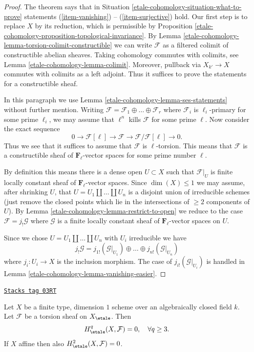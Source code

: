 \begin{proof}
The theorem says that in Situation \ref{etale-cohomology-situation-what-to-prove}
statements (\ref{item-vanishing}) -- (\ref{item-surjective}) hold.
Our first step is to replace $X$ by its reduction, which is permissible
by Proposition \ref{etale-cohomology-proposition-topological-invariance}.
By Lemma \ref{etale-cohomology-lemma-torsion-colimit-constructible} we can write
$\mathcal{F}$ as a filtered colimit of constructible abelian sheaves.
Taking cohomology commutes with colimits, see Lemma \ref{etale-cohomology-lemma-colimit}.
Moreover, pullback via $X_{k'} \to X$ commutes with colimits as a left
adjoint. Thus it suffices to prove the statements for a constructible sheaf.

\medskip\noindent
In this paragraph we use Lemma \ref{etale-cohomology-lemma-ses-statements} without further
mention. Writing
$\mathcal{F} = \mathcal{F}_1 \oplus \ldots \oplus \mathcal{F}_r$
where $\mathcal{F}_i$ is $\ell_i$-primary for some prime $\ell_i$, we may
assume that $\ell^n$ kills $\mathcal{F}$ for some prime $\ell$. Now consider
the exact sequence
$$
0 \to \mathcal{F}[\ell] \to \mathcal{F} \to \mathcal{F}/\mathcal{F}[\ell] \to 0.
$$
Thus we see that it suffices to assume that $\mathcal{F}$ is $\ell$-torsion.
This means that $\mathcal{F}$ is a constructible sheaf of
$\mathbf{F}_\ell$-vector spaces for some prime number $\ell$.

\medskip\noindent
By definition this means there is a dense open $U \subset X$
such that $\mathcal{F}|_U$ is finite locally constant sheaf of
$\mathbf{F}_\ell$-vector spaces. Since $\dim(X) \leq 1$ we may
assume, after shrinking $U$, that $U = U_1 \amalg \ldots \amalg U_n$
is a disjoint union of irreducible schemes (just remove the closed
points which lie in the intersections of $\geq 2$ components of $U$).
By Lemma \ref{etale-cohomology-lemma-restrict-to-open} we reduce to the case
$\mathcal{F} = j_!\mathcal{G}$ where $\mathcal{G}$ is a finite
locally constant sheaf of $\mathbf{F}_\ell$-vector spaces on $U$.

\medskip\noindent
Since we chose $U = U_1 \amalg \ldots \amalg U_n$ with $U_i$ irreducible
we have
$$
j_!\mathcal{G} =
j_{1!}(\mathcal{G}|_{U_1}) \oplus \ldots \oplus
j_{n!}(\mathcal{G}|_{U_n})
$$
where $j_i : U_i \to X$ is the inclusion morphism.
The case of $j_{i!}(\mathcal{G}|_{U_i})$ is handled in
Lemma \ref{etale-cohomology-lemma-vanishing-easier}.
\end{proof}

\begin{theorem}
\label{etale-cohomology-theorem-vanishing-curves}
\href{https://stacks.math.columbia.edu/tag/03RT}{\texttt{Stacks tag 03RT}}

Let $X$ be a finite type, dimension $1$ scheme over an
algebraically closed field $k$. Let $\mathcal{F}$ be a torsion sheaf
on $X_\etale$. Then
$$
H_\etale^q(X, \mathcal{F}) = 0, \quad \forall q \geq 3.
$$
If $X$ affine then also $H_\etale^2(X, \mathcal{F}) = 0$.
\end{theorem}

